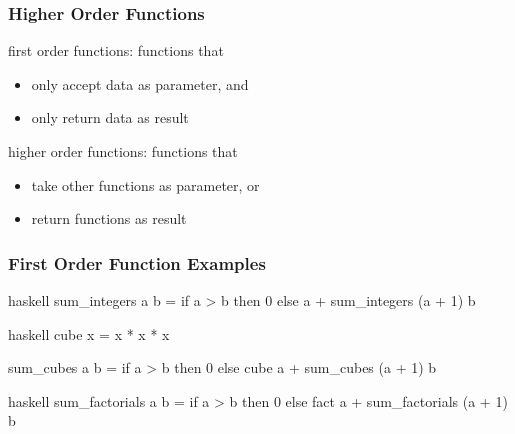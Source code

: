 \documentclass[dvipsnames]{beamer}
\theoremstyle{plain}
\begin{document}
\begin{frame}[fragile]
  \frametitle{Higher Order Functions}

  \begin{definition}
    \alert{first order functions}: functions that\\
    \begin{itemize}
      \item only accept data as parameter, and
      \item only return data as result
    \end{itemize}

    \bigskip
    \alert{higher order functions}: functions that
    \begin{itemize}
      \item take other functions as parameter, or
      \item return functions as result
    \end{itemize}
  \end{definition}
\end{frame}

\begin{frame}[fragile]
  \frametitle{First Order Function Examples}

  \begin{example}[Haskell]
    \begin{pygments}{haskell}
sum_integers a b =
    if a > b then 0 else a + sum_integers (a + 1) b
    \end{pygments}

    \pause
    \bigskip
    \begin{pygments}{haskell}
cube x = x * x * x

sum_cubes a b =
    if a > b then 0 else cube a + sum_cubes (a + 1) b
    \end{pygments}

    \pause
    \bigskip
    \begin{pygments}{haskell}
sum_factorials a b =
    if a > b then 0 else fact a + sum_factorials (a + 1) b
    \end{pygments}
  \end{example}
\end{frame}
\end{document}
